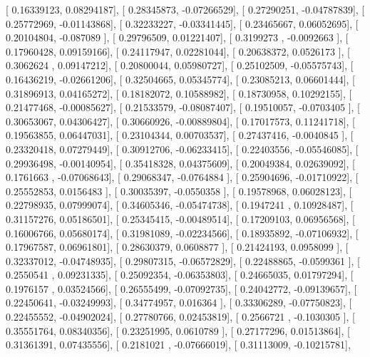 \documentclass{article}
\begin{document}
       [ 0.16339123,  0.08294187],
       [ 0.28345873, -0.07266529],
       [ 0.27290251, -0.04787839],
       [ 0.25772969, -0.01143868],
       [ 0.32233227, -0.03341445],
       [ 0.23465667,  0.06052695],
       [ 0.20104804, -0.087089  ],
       [ 0.29796509,  0.01221407],
       [ 0.3199273 , -0.0092663 ],
       [ 0.17960428,  0.09159166],
       [ 0.24117947,  0.02281044],
       [ 0.20638372,  0.0526173 ],
       [ 0.3062624 ,  0.09147212],
       [ 0.20800044,  0.05980727],
       [ 0.25102509, -0.05575743],
       [ 0.16436219, -0.02661206],
       [ 0.32504665,  0.05345774],
       [ 0.23085213,  0.06601444],
       [ 0.31896913,  0.04165272],
       [ 0.18182072,  0.10588982],
       [ 0.18730958,  0.10292155],
       [ 0.21477468, -0.00085627],
       [ 0.21533579, -0.08087407],
       [ 0.19510057, -0.0703405 ],
       [ 0.30653067,  0.04306427],
       [ 0.30660926, -0.00889804],
       [ 0.17017573,  0.11241718],
       [ 0.19563855,  0.06447031],
       [ 0.23104344,  0.00703537],
       [ 0.27437416, -0.0040845 ],
       [ 0.23320418,  0.07279449],
       [ 0.30912706, -0.06233415],
       [ 0.22403556, -0.05546085],
       [ 0.29936498, -0.00140954],
       [ 0.35418328,  0.04375609],
       [ 0.20049384,  0.02639092],
       [ 0.1761663 , -0.07068643],
       [ 0.29068347, -0.0764884 ],
       [ 0.25904696, -0.01710922],
       [ 0.25552853,  0.0156483 ],
       [ 0.30035397, -0.0550358 ],
       [ 0.19578968,  0.06028123],
       [ 0.22798935,  0.07999074],
       [ 0.34605346, -0.05474738],
       [ 0.1947241 ,  0.10928487],
       [ 0.31157276,  0.05186501],
       [ 0.25345415, -0.00489514],
       [ 0.17209103,  0.06956568],
       [ 0.16006766,  0.05680174],
       [ 0.31981089, -0.02234566],
       [ 0.18935892, -0.07106932],
       [ 0.17967587,  0.06961801],
       [ 0.28630379,  0.0608877 ],
       [ 0.21424193,  0.0958099 ],
       [ 0.32337012, -0.04748935],
       [ 0.29807315, -0.06572829],
       [ 0.22488865, -0.0599361 ],
       [ 0.2550541 ,  0.09231335],
       [ 0.25092354, -0.06353803],
       [ 0.24665035,  0.01797294],
       [ 0.1976157 ,  0.03524566],
       [ 0.26555499, -0.07092735],
       [ 0.24042772, -0.09139657],
       [ 0.22450641, -0.03249993],
       [ 0.34774957,  0.016364  ],
       [ 0.33306289, -0.07750823],
       [ 0.22455552, -0.04902024],
       [ 0.27780766,  0.02453819],
       [ 0.2566721 , -0.1030305 ],
       [ 0.35551764,  0.08340356],
       [ 0.23251995,  0.0610789 ],
       [ 0.27177296,  0.01513864],
       [ 0.31361391,  0.07435556],
       [ 0.2181021 , -0.07666019],
       [ 0.31113009, -0.10215781],
\end{document}

